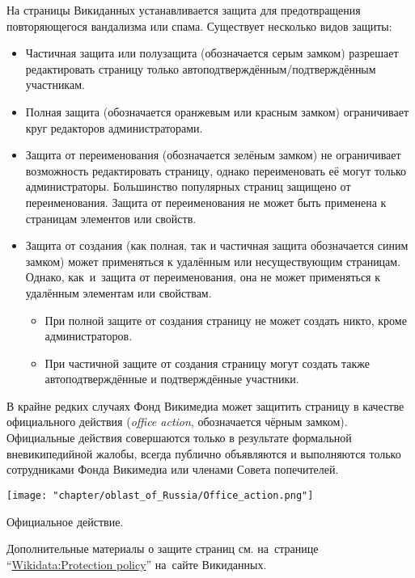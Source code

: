 На страницы Викиданных устанавливается защита 
для предотвращения повторяющегося вандализма или спама. 
Существует несколько видов защиты:
\begin{itemize}
  \item Частичная защита или полузащита (обозначается серым замком) разрешает редактировать страницу только автоподтверждённым/подтверждённым участникам.
  \item Полная защита (обозначается оранжевым или красным замком) ограничивает круг редакторов администраторами.
  \item Защита от переименования (обозначается зелёным замком) не ограничивает возможность редактировать страницу, однако переименовать её могут только администраторы. Большинство популярных страниц защищено от переименования. Защита от переименования не может быть применена к страницам элементов или свойств.
  \item Защита от создания (как полная, так и частичная защита обозначается синим замком) может применяться к удалённым или несуществующим страницам. Однако, как~и~защита от переименования, она не может применяться к удалённым элементам или свойствам.
  \begin{itemize}
	\item При полной защите от создания страницу не может создать никто, кроме администраторов.
	\item При частичной защите от создания страницу могут создать также автоподтверждённые и подтверждённые участники.
  \end{itemize}
\end{itemize}


В крайне редких случаях Фонд Викимедиа может защитить страницу в качестве официального действия (\textit{office action}, обозначается чёрным замком). Официальные действия совершаются только в результате формальной вневикипедийной жалобы, всегда публично объявляются и выполняются только сотрудниками Фонда Викимедиа или членами Совета попечителей.
%
\begin{marginfigure}
\centering\texttt{[image: "chapter/oblast\_of\_Russia/Office\_action.png"]}
\caption [Иконка. Официальное действие.]{Официальное действие.}%
\label{fig:legend_population}%
\end{marginfigure}


Дополнительные материалы о защите страниц см. 
на~странице ``\href{https://www.wikidata.org/wiki/Wikidata:Protection_policy}{Wikidata:Protection policy}'' 
на~сайте Викиданных.
